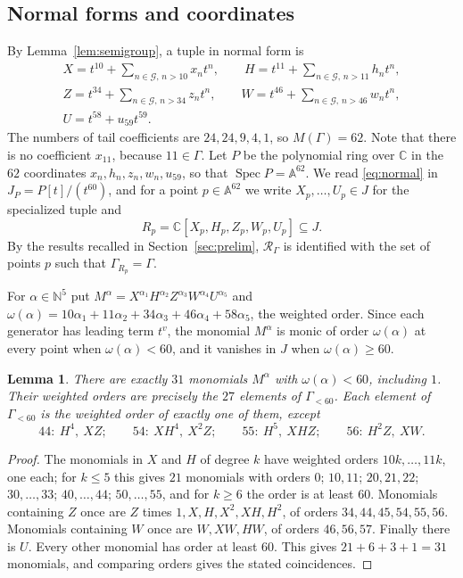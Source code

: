 \documentclass{amsart}
\newtheorem{lemma}[theorem]{Lemma}
\theoremstyle{definition}
\theoremstyle{remark}
\numberwithin{equation}{section}
\newcommand{\CC}{\mathbb{C}}
\newcommand{\NN}{\mathbb{N}}
\newcommand{\AF}{\mathbb{A}}
\newcommand{\Rs}{\mathcal{R}_\Gamma}
\DeclareMathOperator{\Spec}{Spec}
\begin{document}
\subsection{Normal forms and coordinates}
By Lemma~\ref{lem:semigroup}, a tuple in normal form is
\begin{equation}\label{eq:normal}
\begin{gathered}
X=t^{10}+\sum_{n\in\mathcal G,\,n>10}x_nt^n,\qquad
H=t^{11}+\sum_{n\in\mathcal G,\,n>11}h_nt^n,\\
Z=t^{34}+\sum_{n\in\mathcal G,\,n>34}z_nt^n,\qquad
W=t^{46}+\sum_{n\in\mathcal G,\,n>46}w_nt^n,\\
U=t^{58}+u_{59}t^{59}.
\end{gathered}
\end{equation}
The numbers of tail coefficients are $24,24,9,4,1$, so $M(\Gamma)=62$. Note that there is no coefficient $x_{11}$, because $11\in\Gamma$. Let $P$ be the polynomial ring over $\CC$ in the $62$ coordinates $x_n,h_n,z_n,w_n,u_{59}$, so that $\Spec P=\AF^{62}$. We read \eqref{eq:normal} in $J_P=P[t]/(t^{60})$, and for a point $p\in\AF^{62}$ we write $X_p,\dots,U_p\in J$ for the specialized tuple and
\[
R_p=\CC[X_p,H_p,Z_p,W_p,U_p]\subseteq J.
\]
By the results recalled in Section~\ref{sec:prelim}, $\Rs$ is identified with the set of points $p$ such that $\Gamma_{R_p}=\Gamma$.

For $\alpha\in\NN^5$ put $M^\alpha=X^{\alpha_1}H^{\alpha_2}Z^{\alpha_3}W^{\alpha_4}U^{\alpha_5}$ and $\omega(\alpha)=10\alpha_1+11\alpha_2+34\alpha_3+46\alpha_4+58\alpha_5$, the weighted order. Since each generator has leading term $t^v$, the monomial $M^\alpha$ is monic of order $\omega(\alpha)$ at every point when $\omega(\alpha)<60$, and it vanishes in $J$ when $\omega(\alpha)\ge60$.

\begin{lemma}\label{lem:monomials}
There are exactly $31$ monomials $M^\alpha$ with $\omega(\alpha)<60$, including $1$. Their weighted orders are precisely the $27$ elements of $\Gamma_{<60}$. Each element of $\Gamma_{<60}$ is the weighted order of exactly one of them, except
\[
44:\ H^4,\ XZ;\qquad 54:\ XH^4,\ X^2Z;\qquad 55:\ H^5,\ XHZ;\qquad 56:\ H^2Z,\ XW.
\]
\end{lemma}

\begin{proof}
The monomials in $X$ and $H$ of degree $k$ have weighted orders $10k,\dots,11k$, one each; for $k\le5$ this gives $21$ monomials with orders $0$; $10,11$; $20,21,22$; $30,\dots,33$; $40,\dots,44$; $50,\dots,55$, and for $k\ge6$ the order is at least $60$. Monomials containing $Z$ once are $Z$ times $1,X,H,X^2,XH,H^2$, of orders $34,44,45,54,55,56$. Monomials containing $W$ once are $W,XW,HW$, of orders $46,56,57$. Finally there is $U$. Every other monomial has order at least $60$. This gives $21+6+3+1=31$ monomials, and comparing orders gives the stated coincidences.
\end{proof}
\end{document}
